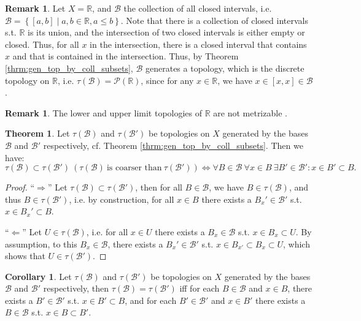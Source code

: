 \documentclass[12pt, a4paper]{article}
\numberwithin{equation}{section}
\theoremstyle{definition}
\theoremstyle{definition}
\newtheorem{remark}[thm]{Remark} %
\newtheorem{theorem}[thm]{Theorem}
\newtheorem{corollary}[thm]{Corollary}
\begin{document}
		\begin{remark}
			Let $X = \mathbb R$, and $\mathscr B$ the collection of all closed intervals, i.e. $\mathscr B = \left\{ [a, b]\mid a, b\in\mathbb R, a \leq b \right\}$. Note that there is a collection of closed intervals s.t. $\mathbb R$ is its union, and the intersection of two closed intervals is either empty or closed. Thus, for all $x$ in the intersection, there is a closed interval that contains $x$ and that is contained in the intersection. Thus, by Theorem \ref{thrm:gen_top_by_coll_subsets}, $\mathscr B$ generates a topology, which is the discrete topology on $\mathbb R$, i.e. $\tau(\mathscr B) = \mathscr P(\mathbb R)$, since for any $x\in \mathbb R$, we have $x\in [x, x]\in \mathscr B$.
		\end{remark}
	
		\begin{remark}
			The lower and upper limit topologies of $\mathbb R$ are not metrizable \cite{790629}.
		\end{remark}
	
		\begin{theorem}\label{thrm:comp_topologies_bases}
			Let $\tau(\mathscr B)$ and $\tau(\mathscr B')$ be topologies on $X$ generated by the bases $\mathscr B$ and $\mathscr B'$ respectively, cf. Theorem \ref{thrm:gen_top_by_coll_subsets}. Then we have:
			$$\tau(\mathscr B)\subset \tau(\mathscr B') \ (\tau(\mathscr B)\ \text{is coarser than}\ \tau(\mathscr B')) \Leftrightarrow \forall B\in\mathscr B\ \forall x\in B\ \exists B'\in\mathscr B': x\in B'\subset B.$$
		\end{theorem}
		
		\begin{proof}
			\enquote{$\Longrightarrow$} Let $\tau(\mathscr B)\subset \tau(\mathscr B')$, then for all $B\in\mathscr B$, we have $B\in\tau(\mathscr B)$, and thus $B\in \tau(\mathscr B')$, i.e. by construction, for all $x\in B$ there exists a $B_x'\in\mathscr B'$ s.t. $x\in B_x'\subset B$.
			
			\enquote{$\Longleftarrow$} Let $U\in\tau(\mathscr B)$, i.e. for all $x\in U$ there exists a $B_x\in \mathscr B$ s.t. $x\in B_x\subset U$. By assumption, to this $B_x\in\mathscr B$, there exists a $B_x'\in\mathscr B'$ s.t. $x\in B_{x'} \subset B_x\subset U$, which shows that $U\in\tau(\mathscr B')$.
		\end{proof} 
		
		\begin{corollary}\label{corollary:equality_of_topologies}
			Let $\tau(\mathscr B)$ and $\tau(\mathscr B')$ be topologies on $X$ generated by the bases $\mathscr B$ and $\mathscr B'$ respectively, then $\tau(\mathscr B) = \tau(\mathscr B')$ iff for each $B\in \mathscr B$ and $x\in B$, there exists a $B'\in\mathscr B'$ s.t. $x\in B'\subset B$, and for each $B'\in \mathscr B'$ and $x\in B'$ there exists a $B\in\mathscr B$ s.t. $x\in B\subset B'$.
		\end{corollary}
	
\end{document}
